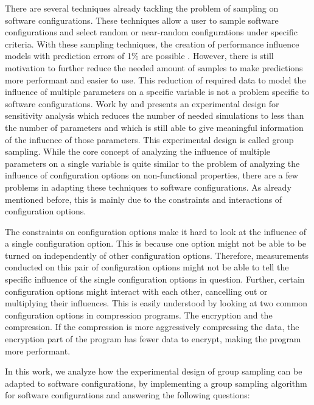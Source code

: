 \documentclass[../thesis.tex]{subfiles}
\begin{document}
There are several techniques already tackling the problem of sampling on software configurations.
These techniques allow a user to sample software configurations and select random or near-random configurations under specific criteria.
With these sampling techniques, the creation of performance influence models with prediction errors of 1\% are possible \cite{siegmund2015performance}.
However, there is still motivation to further reduce the needed amount of samples to make predictions more performant and easier to use.
This reduction of required data to model the influence of multiple parameters on a specific variable is not a problem specific to software configurations.
Work by \citet{andres1997sampling} and \citet{saltelli2008global} presents an experimental design for sensitivity analysis
which reduces the number of needed
simulations to less than the number of parameters and which is still able to give meaningful information of the influence of those parameters.
This experimental design is called group sampling. While the core concept of analyzing the influence of multiple parameters on a single variable is
quite similar to the problem of analyzing the influence of configuration options on non-functional properties, there are a few problems in adapting
these techniques to software configurations.
As already mentioned before, this is mainly due to the constraints and interactions of configuration options.

The constraints on configuration options make it hard to look at the influence of a single configuration option.
This is because one option might not be able to be turned on independently of other configuration options.
Therefore, measurements conducted on this pair of configuration options might not be able to tell the specific influence of
the single configuration options in question. Further, certain configuration options might interact with each other,
cancelling out or multiplying their influences. This is easily understood by looking at two common configuration options
in compression programs. The encryption and the compression. If the compression is more aggressively compressing the data,
the encryption part of the program has fewer data to encrypt, making the program more performant.


In this work, we analyze how the experimental design of group sampling can be adapted to software configurations, by implementing a group sampling
algorithm for software configurations and answering the following questions:
\end{document}
